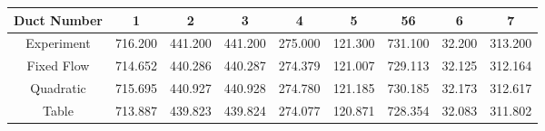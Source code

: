 \begin{center}
\begin{tabular}{|c|c|c|c|c|c|c|c|c|} \hline
Duct Number & 1 & 2 & 3 & 4 & 5 & 56 & 6 & 7 \\ \hline
Experiment &
716.200 & 441.200 & 441.200 & 275.000 & 121.300 & 731.100 & 32.200 & 313.200 \\
Fixed Flow & 714.652 & 440.286 & 440.287 & 274.379 & 121.007 & 729.113 & 32.125 & 312.164 \\
Quadratic & 715.695 & 440.927 & 440.928 & 274.780 & 121.185 & 730.185 & 32.173 & 312.617 \\
Table & 713.887 & 439.823 & 439.824 & 274.077 & 120.871 & 728.354 & 32.083 & 311.802 \\
\hline
\end{tabular}
\end{center}
